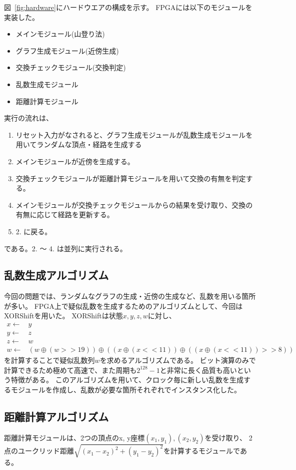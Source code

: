 図~\ref{fig:hardware}にハードウエアの構成を示す。
FPGAには以下のモジュールを実装した。
\begin{itemize}
    \item メインモジュール(山登り法)
    \item グラフ生成モジュール(近傍生成)
    \item 交換チェックモジュール(交換判定)
    \item 乱数生成モジュール
    \item 距離計算モジュール
\end{itemize}
実行の流れは、
\begin{enumerate}
    \item リセット入力がなされると、グラフ生成モジュールが乱数生成モジュールを用いてランダムな頂点・経路を生成する
    \item メインモジュールが近傍を生成する。
    \item 交換チェックモジュールが距離計算モジュールを用いて交換の有無を判定する。
    \item メインモジュールが交換チェックモジュールからの結果を受け取り、交換の有無に応じて経路を更新する。
    \item 2. に戻る。
\end{enumerate}
である。2. ～ 4. は並列に実行される。

\subsection{乱数生成アルゴリズム}
今回の問題では、ランダムなグラフの生成・近傍の生成など、乱数を用いる箇所が多い。
FPGA上で疑似乱数を生成するためのアルゴリズムとして、今回はXORShiftを用いた。
XORShiftは状態$x, y, z, w$に対し、
\begin{align*}
    x \leftarrow& y \\
    y \leftarrow& z \\
    z \leftarrow& w \\
    w \leftarrow& (w\oplus(w>>19))\oplus((x\oplus(x<<11))\oplus((x\oplus(x<<11))>>8))
\end{align*}
を計算することで疑似乱数列${w}$を求めるアルゴリズムである。
ビット演算のみで計算できるため極めて高速で、また周期も$2^{128}-1$と非常に長く品質も高いという特徴がある。
このアルゴリズムを用いて、クロック毎に新しい乱数を生成するモジュールを作成し、乱数が必要な箇所それぞれでインスタンス化した。

\subsection{距離計算アルゴリズム}\label{sec:distance}
距離計算モジュールは、2つの頂点のx, y座標$(x_1, y_1), (x_2, y_2)$を受け取り、
2点のユークリッド距離$\sqrt{(x_1-x_2)^2+(y_1-y_2)^2}$を計算するモジュールである。

